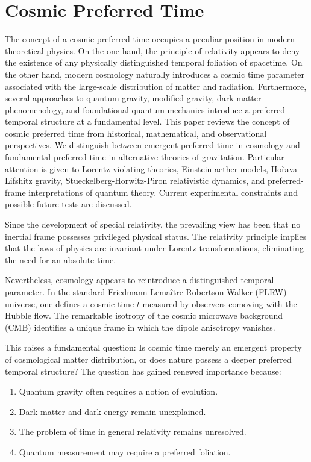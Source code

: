 \section{Cosmic Preferred Time}
\label{crt:cpt}

The concept of a cosmic preferred time occupies a peculiar position in
modern theoretical physics. On the one hand, the principle of relativity
appears to deny the existence of any physically distinguished temporal
foliation of spacetime. On the other hand, modern cosmology naturally
introduces a cosmic time parameter associated with the large-scale
distribution of matter and radiation. Furthermore, several approaches to
quantum gravity, modified gravity, dark matter phenomenology, and
foundational quantum mechanics introduce a preferred temporal structure at
a fundamental level. This paper reviews the concept of cosmic preferred
time from historical, mathematical, and observational perspectives. We
distinguish between emergent preferred time in cosmology and fundamental
preferred time in alternative theories of gravitation. Particular attention
is given to Lorentz-violating theories, Einstein-aether models,
Hořava-Lifshitz gravity, Stueckelberg-Horwitz-Piron relativistic dynamics,
and preferred-frame interpretations of quantum theory. Current experimental
constraints and possible future tests are discussed.

Since the development of special relativity, the prevailing view has been
that no inertial frame possesses privileged physical status. The relativity
principle implies that the laws of physics are invariant under Lorentz
transformations, eliminating the need for an absolute time.

Nevertheless, cosmology appears to reintroduce a distinguished temporal
parameter. In the standard Friedmann-Lemaître-Robertson-Walker (FLRW)
universe, one defines a cosmic time $ t $  measured by observers comoving
with the Hubble flow. The remarkable isotropy of the cosmic microwave
background (CMB) identifies a unique frame in which the dipole 
anisotropy vanishes.

This raises a fundamental question:
Is cosmic time merely an emergent property of cosmological matter
distribution, or does nature possess a deeper preferred temporal structure?
The question has gained renewed importance because:
\begin{enumerate}
   \item Quantum gravity often requires a notion of evolution.
   \item Dark matter and dark energy remain unexplained.
   \item The problem of time in general relativity remains unresolved.
   \item Quantum measurement may require a preferred foliation.
\end{enumerate}

